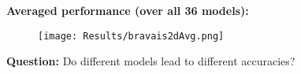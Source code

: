 \vspace{-.6cm}
\textbf{Averaged performance (over all 36 models):}
\begin{figure}
    \centering
    \texttt{[image: Results/bravais2dAvg.png]}
    \label{fig:avgBravais2d}
\end{figure}
\textbf{Question: } Do different models lead to different accuracies?
